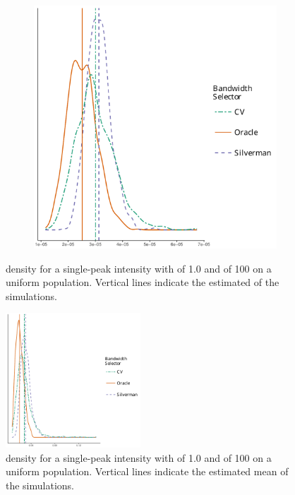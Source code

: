 \begin{figure}[htbp]
\begin{subfigure}[b]{0.45\textwidth}
        \includegraphics[width=\textwidth]{output/iae-normalized-histogram}
    \end{subfigure}
    \caption[: Single-peak of 100 on uniform population]{ density for a single-peak intensity with  of 1.0 and  of 100 on a uniform population. Vertical lines indicate the estimated  of the simulations.}
    \label{fig:iae:unif_100_1.0_1h}
\end{figure}

\begin{figure}[htbp]
    \centering
    \includegraphics[width=0.45\textwidth]{output/maxerr-histogram}
    \caption[: Single-peak of 100 on uniform population]{ density for a single-peak intensity with  of 1.0 and  of 100 on a uniform population. Vertical lines indicate the estimated mean  of the simulations.}
    \label{fig:maxerr:unif_100_1.0_1h}
\end{figure}

